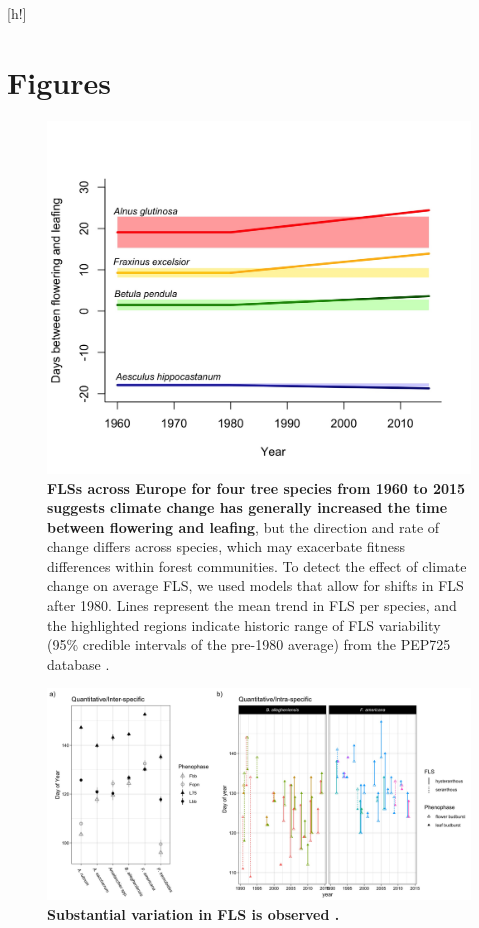 \documentclass{article}
\begin{document}
{[h!]
 
\pagebreak

\section*{Figures}
\begin{figure}[h!]
    \centering
 \includegraphics[width=\textwidth]{..//PEP725/FLS_climate_change.jpeg} 
    \caption{\textbf{FLSs across Europe for four tree species from 1960 to 2015 suggests climate change has generally increased the time between flowering and leafing}, but the direction and rate of change differs across species, which may exacerbate fitness differences within forest communities. To detect the effect of climate change on average FLS, we used models that allow for shifts in FLS after 1980. Lines represent the mean trend in FLS per species, and the highlighted regions indicate historic range of FLS variability (95\% credible intervals of the pre-1980 average) from the PEP725 database \citep{PEP725}.}
    \label{fig:climchange}
\end{figure}
 
 \begin{figure}[h!]
        \centering
          \includegraphics[width=\textwidth]{..//HarvardForest/FLS_viz.jpeg}
          \caption{\textbf{Substantial variation in FLS is observed .}  }
        \label{fig:vizzy}
    \end{figure}
    
}
\end{document}
